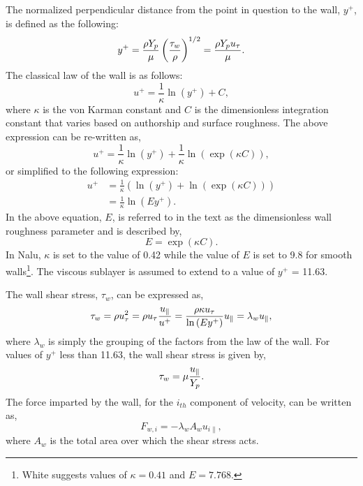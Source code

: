 The normalized perpendicular distance from the point in question to the wall, $y^+$, is defined as
the following:
%
\begin{equation} 
        y^+ = {{ \rho Y_p} \over {\mu }}\left(\tau_w \over \rho \right)^{1/2} 
            = {{ \rho Y_p u_{\tau}} \over {\mu }}.
\label{yplus}
\end{equation}
%
The classical law of the wall is as follows:
%
\begin{equation}
       u^+ = \frac{1}{\kappa} \ln(y^+) + C,
\label{lawOfWall1}
\end{equation}
%
where $\kappa$ is the von Karman constant and $C$ is the dimensionless 
integration constant that varies based on authorship and surface roughness. 
The above expression can be re-written as,
%
\begin{equation}
       u^+ = \frac{1}{\kappa} \ln(y^+) + \frac{1}{\kappa} \ln(\exp(\kappa C)),
\label{lawOfWall2}
\end{equation}
%
or simplified to the following expression:
%
\begin{align}
       u^+ &= \frac{1}{\kappa} \left(\ln(y^+) + \ln(\exp(\kappa C))\right) \\
           &= \frac{1}{\kappa} \ln(E y^+).
\label{lawOfWall3}
\end{align}
%
In the above equation, $E$, is referred to in the text as the dimensionless wall 
roughness parameter and is described by,
%
\begin{equation}
       E = \exp(\kappa C).
\label{ElogParam}
\end{equation}
%
In Nalu, $\kappa$ is set to the value of 0.42 while the 
value of $E$ is set to 9.8 for smooth walls\footnote{White 
suggests values of $\kappa=0.41$ and $E=7.768$.}. 
The viscous sublayer is assumed to extend to a value of $y^+$ = 11.63.

The wall shear stress, $\tau_w$, can be expressed as,
%
\begin{equation} 
        \tau_w = \rho u_\tau^2 = \rho u_\tau {{u_\|} \over {u^+}}
               = { {\rho \kappa u_{\tau}}  \over {\ln \left(Ey^+\right) } }u_\|
               = \lambda_w u_\| ,
\label{wall_shear_trb}
\end{equation}
%
where $\lambda_w$ is simply the grouping of the factors from the law of the wall.
For values of $y^+$ less than 11.63, the wall shear stress is given by,
%
\begin{equation}
        \tau_w =  \mu {u_\| \over Y_p} .
\label{wall_shear_lam}
\end{equation}
%
The force imparted by the wall, for the $i_{th}$ component of velocity,
can be written as,
%
\begin{equation}
        F_{w,i}= -\lambda_w A_w u_{i\|} ,
\label{wall_force_1}
\end{equation}
%
where $A_w$ is the total area over which the shear stress acts.

